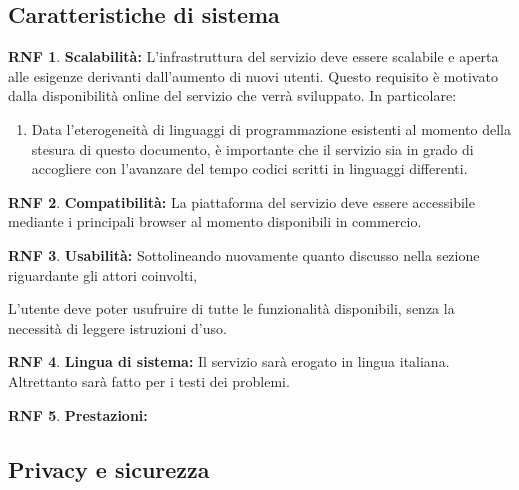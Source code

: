 \documentclass[11pt, a4paper]{article}
\theoremstyle{definition}
\newtheorem{nonfuncreq}{RNF} %
\begin{document}
\subsection{Caratteristiche di sistema}

\begin{nonfuncreq}
\label{scalabilita}
\textbf{Scalabilità:}
L'infrastruttura del servizio deve essere scalabile e aperta alle esigenze
derivanti dall'aumento di nuovi utenti. Questo requisito è motivato dalla
disponibilità online del servizio che verrà sviluppato. In particolare:
\begin{enumerate}
    \item Data l'eterogeneità di linguaggi di programmazione esistenti
    al momento della stesura di questo documento, è importante che il
    servizio sia in grado di accogliere con l'avanzare del tempo codici
    scritti in linguaggi differenti.
\end{enumerate}
\end{nonfuncreq}

\begin{nonfuncreq}
\label{compatibility}
\textbf{Compatibilità:}
La piattaforma del servizio deve essere accessibile mediante i principali
browser al momento disponibili in commercio.
\end{nonfuncreq}

\begin{nonfuncreq}
\textbf{Usabilità:}
Sottolineando nuovamente quanto discusso nella sezione riguardante gli
attori coinvolti, 

L'utente deve poter usufruire di tutte le funzionalità disponibili, senza
la necessità di leggere istruzioni d'uso.
\end{nonfuncreq}

\begin{nonfuncreq}
\textbf{Lingua di sistema:}
Il servizio sarà erogato in lingua italiana. Altrettanto sarà fatto per i
testi dei problemi.
\end{nonfuncreq}

\begin{nonfuncreq}
\textbf{Prestazioni:}
\end{nonfuncreq}

\subsection{Privacy e sicurezza}
\end{document}
